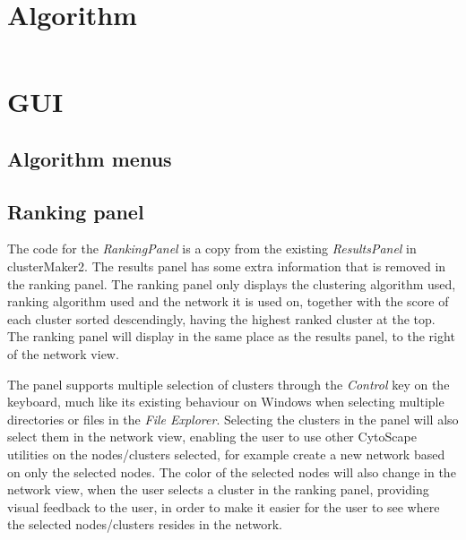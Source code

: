 \section{Algorithm}

\inputminted[linenos,fontsize=\scriptsize,firstline=260,lastline=282]{java}{../ranklust-app/src/main/java/edu/ucsf/rbvi/clusterMaker2/internal/api/Rank.java}
\section{GUI}
\subsection{Algorithm menus}
\subsection{Ranking panel}
The code for the \textit{RankingPanel} is a copy from the existing
\textit{ResultsPanel} in clusterMaker2. The results panel has some extra
information that is removed in the ranking panel. The ranking panel only
displays the clustering algorithm used, ranking algorithm used and the network
it is used on, together with the score of each cluster sorted descendingly,
having the highest ranked cluster at the top. The ranking panel will display in
the same place as the results panel, to the right of the network view.

The panel supports multiple selection of clusters through the \textit{Control}
key on the keyboard, much like its existing behaviour on Windows when selecting
multiple directories or files in the \textit{File Explorer}. Selecting the
clusters in the panel will also select them in the network view, enabling the
user to use other CytoScape utilities on the nodes/clusters selected, for
example create a new network based on only the selected nodes. The color of the
selected nodes will also change in the network view, when the user selects a
cluster in the ranking panel, providing visual feedback to the user, in order to
make it easier for the user to see where the selected nodes/clusters resides in
the network.
\inputminted[linenos,fontsize=\scriptsize,firstline=260,lastline=282]{java}{../ranklust-app/src/main/java/edu/ucsf/rbvi/clusterMaker2/internal/ui/RankingPanel.java}
